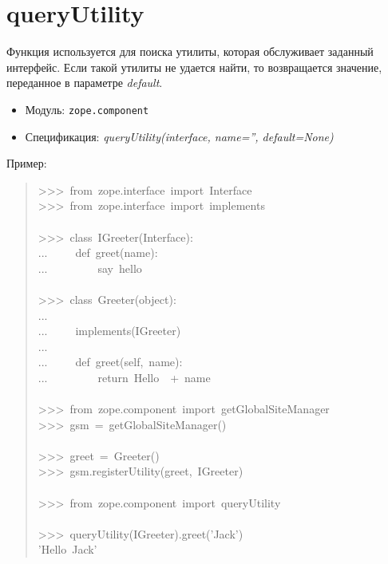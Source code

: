 \documentclass[14pt,a4paper,openany,twoside,final]{extbook}
\providecommand*{\DUroletitlereference}[1]{\textsl{#1}}
\begin{document}
\section*{queryUtility%
  \label{queryutility}%
}

Функция используется для поиска утилиты, которая обслуживает заданный
интерфейс.  Если такой утилиты не удается найти, то возвращается
значение, переданное в параметре \DUroletitlereference{default}.

\begin{itemize}

\item Модуль: \texttt{zope.component}

\item Спецификация: \DUroletitlereference{queryUtility(interface, name='', default=None)}

\end{itemize}

Пример:

\begin{quote}{\ttfamily \raggedright \noindent
>{}>{}>~from~zope.interface~import~Interface\\
>{}>{}>~from~zope.interface~import~implements\\
~\\
>{}>{}>~class~IGreeter(Interface):\\
...~~~~~def~greet(name):\\
...~~~~~~~~~\textquotedbl{}say~hello\textquotedbl{}\\
~\\
>{}>{}>~class~Greeter(object):\\
...\\
...~~~~~implements(IGreeter)\\
...\\
...~~~~~def~greet(self,~name):\\
...~~~~~~~~~return~\textquotedbl{}Hello~\textquotedbl{}~+~name\\
~\\
>{}>{}>~from~zope.component~import~getGlobalSiteManager\\
>{}>{}>~gsm~=~getGlobalSiteManager()\\
~\\
>{}>{}>~greet~=~Greeter()\\
>{}>{}>~gsm.registerUtility(greet,~IGreeter)\\
~\\
>{}>{}>~from~zope.component~import~queryUtility\\
~\\
>{}>{}>~queryUtility(IGreeter).greet('Jack')\\
'Hello~Jack'
}
\end{quote}
\end{document}
